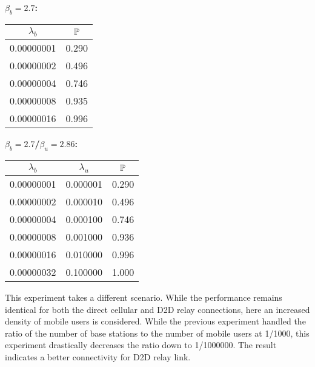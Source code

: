\vspace{1cm}
\begin{minipage}{.45\textwidth}
{\bf \(\beta_b=2.7\):}
	\begin{tabular}{|c|c|}
	\(\lambda_b\) & \(\P\) \\ \hline
	0.00000001 & 0.290 \\ \hline
	0.00000002 & 0.496 \\ \hline
	0.00000004 & 0.746 \\ \hline
	0.00000008 & 0.935 \\ \hline
	0.00000016 & 0.996 \\ \hline
	\end{tabular}
\end{minipage}
\begin{minipage}{.3\textwidth}
{\bf \(\beta_b=2.7\)/\(\beta_u=2.86\):}
	\begin{tabular}{|c|c|c|}
	\(\lambda_b\) & \(\lambda_u\) & \(\P\) \\ \hline
	0.00000001 & 0.000001 & 0.290 \\ \hline
	0.00000002 & 0.000010 & 0.496 \\ \hline
	0.00000004 & 0.000100 & 0.746 \\ \hline
	0.00000008 & 0.001000 & 0.936 \\ \hline
	0.00000016 & 0.010000 & 0.996 \\ \hline
	0.00000032 & 0.100000 & 1.000 \\ \hline
	\end{tabular}
\end{minipage}
\FloatBarrier
\vspace{1.5em}{\bf Analysis:} This experiment takes a different scenario. While the performance remains identical for both the direct cellular and D2D relay connections, here an increased density of mobile users is considered. While the previous experiment handled the ratio of the number of base stations to the number of mobile users at 1/1000, this experiment drastically decreases the ratio down to 1/1000000. The result indicates a better connectivity for D2D relay link.
\begin{figure}[!hb]
  \caption {}
\end{figure}
